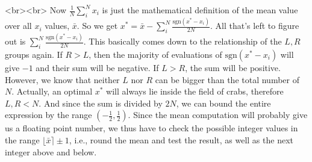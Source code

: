 <br><br>
Now $\frac{1}{N}\sum_i^N x_i$ is just the mathematical definition of the mean value over all $x_i$ values, $\bar{x}$. So we get $x^\ast = \bar{x} - \sum_i^N \frac{\text{sgn}(x^\ast-x_i)}{2N}$. All that's left to figure out is $\sum_i^N \frac{\text{sgn}(x^\ast-x_i)}{2N}$. This basically comes down to the relationship of the $L,R$ groups again. If $R > L$, then the majority of evaluations of $\text{sgn}(x^\ast-x_i)$ will give $-1$ and their sum will be negative. If $L > R$, the sum will be positive. However, we know that neither $L$ nor $R$ can be bigger than the total number of $N$. Actually, an optimal $x^\ast$ will always lie inside the field of crabs, therefore $L,R < N$. And since the sum is divided by $2N$, we can bound the entire expression by the range $(-\frac{1}{2},\frac{1}{2})$. Since the mean computation will probably give us a floating point number, we thus have to check the possible integer values in the range $\lfloor \bar{x} \rceil \pm 1$, i.e., round the mean and test the result, as well as the next integer above and below.